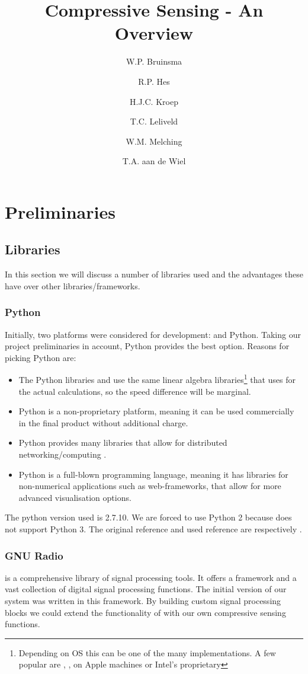 \documentclass[a4paper, openany, oneside]{memoir}
\title{Compressive Sensing - An Overview}
\author{W.P. Bruinsma \and R.P. Hes \and H.J.C. Kroep \and T.C. Leliveld \and W.M. Melching \and T.A. aan de Wiel}
\begin{document}
\chapter{Preliminaries}
\section{Libraries}
\label{sec:libraries}
In this section we will discuss a number of libraries used and the advantages these have over other libraries/frameworks.

\subsection{Python}
\label{sec:python}
Initially, two platforms were considered for development: \matlab{} and Python. Taking our project preliminaries in account, Python provides the best option. Reasons for picking Python are:
\begin{itemize}
    \item The Python libraries  and  use the same linear algebra libraries\footnote{Depending on OS this can be one of the many implementations. A few popular are , ,  on Apple machines or Intel's proprietary } that \matlab{} uses for the actual calculations, so the speed difference will be marginal.
    \item Python is a non-proprietary platform, meaning it can be used commercially in the final product without additional charge.
    \item Python provides many libraries that allow for distributed networking/computing \cite{pythonmp}.
    \item Python is a full-blown programming language, meaning it has libraries for non-numerical applications such as web-frameworks, that allow for more advanced visualisation options.
\end{itemize}
The python version used is 2.7.10. We are forced to use Python 2 because  does not support Python 3. The original reference and used reference are respectively \cite{Rossum:1995:PRM:869369}\cite{python2}.

\subsection{GNU Radio}
\label{sec:gnu-radio}
 is a comprehensive library of signal processing tools. It offers a framework and a vast collection of digital signal processing functions. The initial version of our system was written in this framework. By building custom signal processing blocks we could extend the functionality of  with our own compressive sensing functions.
\end{document}
